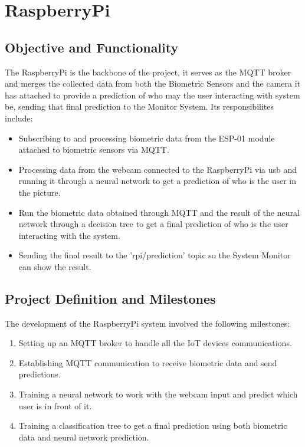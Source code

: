 \documentclass{article}
\begin{document}
\section{RaspberryPi}

\subsection{Objective and Functionality}
The RaspberryPi is the backbone of the project, it serves as the MQTT broker and merges the collected data from both the Biometric Sensors and the camera it has attached to provide a prediction of who may the user interacting with system be, sending that final prediction to the Monitor System. Its responsibilites include:
\begin{itemize}
    \item Subscribing to and processing biometric data from the ESP-01 module attached to biometric sensors via MQTT.
    \item Processing data from the webcam connected to the RaspberryPi via usb and running it through a neural network to get a prediction of who is the user in the picture.
    \item Run the biometric data obtained through MQTT and the result of the neural network through a decision tree to get a final prediction of who is the user interacting with the system.
    \item Sending the final result to the 'rpi/prediction' topic so the System Monitor can show the result.
\end{itemize}

\subsection{Project Definition and Milestones}
The development of the RaspberryPi system involved the following milestones:
\begin{enumerate}
    \item Setting up an MQTT broker to handle all the IoT devices communications.
    \item Establishing MQTT communication to receive biometric data and send predictions.
    \item Training a neural network to work with the webcam input and predict which user is in front of it.
    \item Training a classification tree to get a final prediction using both biometric data and neural network prediction.
\end{enumerate}
\end{document}
